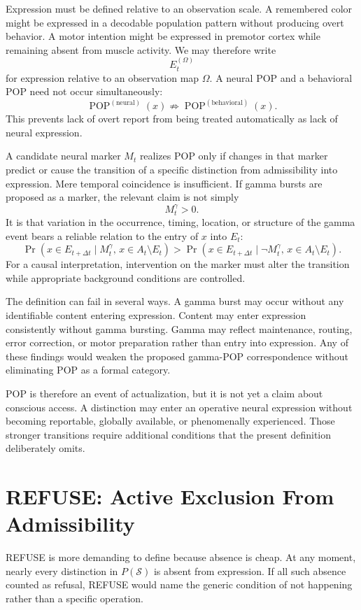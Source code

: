 \documentclass[11pt]{book}
\begin{document}
Expression must be defined relative to an observation scale. A remembered color might be expressed in a decodable population pattern without producing overt behavior. A motor intention might be expressed in premotor cortex while remaining absent from muscle activity. We may therefore write
\[
E_t^{(\Omega)}
\]
for expression relative to an observation map $\Omega$. A neural POP and a behavioral POP need not occur simultaneously:
\[
\operatorname{POP}^{(\mathrm{neural})}(x)
\not\Rightarrow
\operatorname{POP}^{(\mathrm{behavioral})}(x).
\]
This prevents lack of overt report from being treated automatically as lack of neural expression.

A candidate neural marker $M_t$ realizes POP only if changes in that marker predict or cause the transition of a specific distinction from admissibility into expression. Mere temporal coincidence is insufficient. If gamma bursts are proposed as a marker, the relevant claim is not simply
\[
M_t^{\gamma}>0.
\]
It is that variation in the occurrence, timing, location, or structure of the gamma event bears a reliable relation to the entry of $x$ into $E_t$:
\[
\Pr\!\left(x\in E_{t+\Delta t}
\mid
M_t^{\gamma},\,x\in A_t\setminus E_t\right)
>
\Pr\!\left(x\in E_{t+\Delta t}
\mid
\neg M_t^{\gamma},\,x\in A_t\setminus E_t\right).
\]
For a causal interpretation, intervention on the marker must alter the transition while appropriate background conditions are controlled.

The definition can fail in several ways. A gamma burst may occur without any identifiable content entering expression. Content may enter expression consistently without gamma bursting. Gamma may reflect maintenance, routing, error correction, or motor preparation rather than entry into expression. Any of these findings would weaken the proposed gamma-POP correspondence without eliminating POP as a formal category.

POP is therefore an event of actualization, but it is not yet a claim about conscious access. A distinction may enter an operative neural expression without becoming reportable, globally available, or phenomenally experienced. Those stronger transitions require additional conditions that the present definition deliberately omits.

\section*{REFUSE: Active Exclusion From Admissibility}

REFUSE is more demanding to define because absence is cheap. At any moment, nearly every distinction in $P(\mathcal S)$ is absent from expression. If all such absence counted as refusal, REFUSE would name the generic condition of not happening rather than a specific operation.
\end{document}
